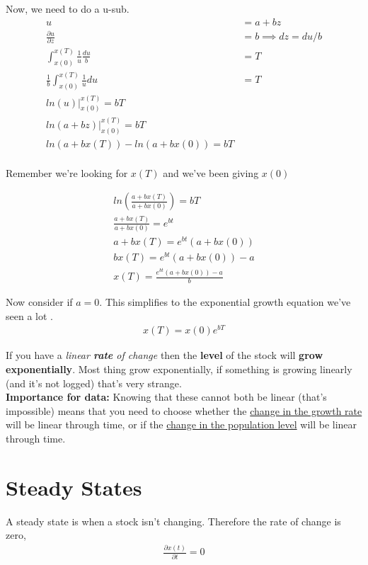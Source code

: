 \documentclass{article}
\begin{document}
Now, we need to do a u-sub. 
\begin{align*}
    u &= a + bz\\
    \frac{\partial u}{\partial z} &= b \implies dz = du / b\\
    \int_{x(0)}^{x(T)} \frac{1}{u} \frac{du}{b} &= T \\
    \frac{1}{b }\int_{x(0)}^{x(T)} \frac{1}{u} du &= T\\
    ln(u)|_{x(0)}^{x(T)} = bT \\
    ln(a + bz) |_{x(0)}^{x(T)} = bT \\
    ln(a + b x(T)) - ln (a + b x(0)) = bT \\
\end{align*}

Remember we're looking for $x(T)$ and we've been giving $x(0)$

\begin{align*}
    ln(\frac{a + b x(T)}{a + b x(0)}) = bT \\
    \frac{a + b x(T)}{a + b x(0)} = e^{bt} \\
    a + b x(T) = e^{bt} (a + b x(0)) \\
    b x(T) = e^{bt} (a + b x(0)) - a \\
    x(T) = \frac{e^{bt} (a + b x(0)) - a}{b}
\end{align*}

Now consider if $a = 0$. This simplifies to the exponential growth equation we've seen a lot .
\begin{align*}
    x(T) = x(0) e^{bT} 
\end{align*}


If you have a \textit{linear \textbf{rate} of change} then the \textbf{level} of the stock will \textbf{grow exponentially}. Most thing grow exponentially, if something is growing linearly (and it's not logged) that's very strange. \\


\textbf{Importance for data:} Knowing that these cannot both be linear (that's impossible) means that you need to choose whether the \underline{change in the growth rate} will be linear through time, or if the \underline{change in the population level} will be linear through time. 


\section{Steady States}
A steady state is when a stock isn't changing. Therefore the rate of change is zero, 
\begin{align*}
    \frac{\partial x(t)}{\partial t} = 0
\end{align*}
\end{document}
